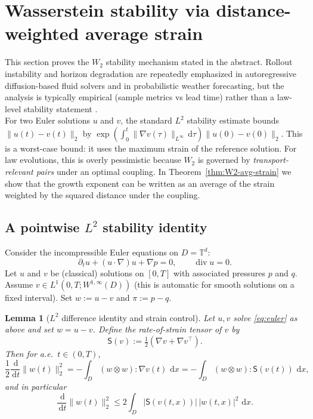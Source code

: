 \documentclass{article}
\numberwithin{equation}{section}
\theoremstyle{plain}
\newtheorem{lemma}[theorem]{Lemma}
\theoremstyle{definition}
\theoremstyle{remark}
\newcommand{\T}{\mathbb{T}}
\newcommand{\dd}{\,\mathrm{d}}
\DeclareMathOperator{\divg}{div}
\begin{document}
\section{Wasserstein stability via distance-weighted average strain}
\label{sec:stability}

This section proves the $W_2$ stability mechanism stated in the abstract. Rollout instability and horizon degradation are repeatedly emphasized in autoregressive diffusion-based fluid solvers and in probabilistic weather forecasting, but the analysis is typically empirical (sample metrics vs lead time) rather than a law-level stability statement \cite{kohl2023benchmarking, lippe2308pde, schiff2024dyslim}.\\


For two Euler solutions $u$ and $v$, the standard $L^2$ stability estimate bounds
$\|u(t)-v(t)\|_2$ by $\exp(\int_0^t \|\nabla v(\tau)\|_{L^\infty}\dd\tau)\|u(0)-v(0)\|_2$.
This is a worst-case bound: it uses the maximum strain of the reference solution.
For law evolutions, this is overly pessimistic because $W_2$ is governed by \emph{transport-relevant pairs} under an optimal coupling.
In Theorem~\ref{thm:W2-avg-strain} we show that the growth exponent can be written as an average of the strain weighted by the squared distance under the coupling.

\subsection{A pointwise $L^2$ stability identity}

Consider the incompressible Euler equations on $D=\T^d$:
\begin{equation}\label{eq:euler}
\partial_t u + (u\cdot\nabla)u + \nabla p = 0,
\qquad
\divg u = 0.
\end{equation}
Let $u$ and $v$ be (classical) solutions on $[0,T]$ with associated pressures $p$ and $q$.
Assume $v\in L^1(0,T;W^{1,\infty}(D))$ (this is automatic for smooth solutions on a fixed interval).
Set $w:=u-v$ and $\pi:=p-q$.

\begin{lemma}[$L^2$ difference identity and strain control]\label{lem:L2-diff-strain}
Let $u,v$ solve \eqref{eq:euler} as above and set $w=u-v$.
Define the rate-of-strain tensor of $v$ by
\[
\mathsf S(v):=\tfrac12(\nabla v+\nabla v^\top).
\]
Then for a.e.\ $t\in(0,T)$,
\begin{equation}\label{eq:L2-diff}
\frac12\frac{\dd}{\dd t}\|w(t)\|_2^2
=
-\int_D (w\otimes w):\nabla v(t)\,\dd x
=
-\int_D (w\otimes w):\mathsf S(v(t))\,\dd x,
\end{equation}
and in particular
\begin{equation}\label{eq:L2-diff-ineq}
\frac{\dd}{\dd t}\|w(t)\|_2^2
\le 2\int_D |\mathsf S(v(t,x))|\,|w(t,x)|^2\,\dd x.
\end{equation}
\end{lemma}
\end{document}
